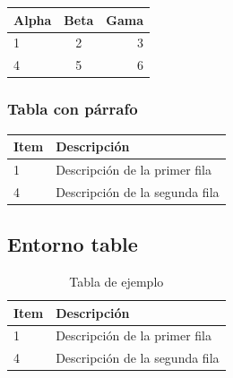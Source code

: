 \documentclass{article}
\begin{document}
\begin{tabular}{| l | c | r |}
\hline
Alpha & Beta & Gama \\
\hline \hline
1 & 2 & 3 \\
\hline
4 & 5 & 6 \\
\hline
\end{tabular}

\subsubsection{Tabla con párrafo}

\begin{tabular}{| l | p{2.5cm} |}
\hline
Item & Descripción \\
\hline \hline
1 & Descripción de la primer fila \\
\hline
4 & Descripción de la segunda fila \\
\hline
\end{tabular}

\subsection{Entorno table}

\begin{table}[h]
  \centering
  \begin{tabular}{| l | p{2.5cm} |}
  \hline
  Item & Descripción \\
  \hline \hline
  1 & Descripción de la primer fila \\
  \hline
  4 & Descripción de la segunda fila \\
  \hline
  \end{tabular}
  \caption{Tabla de ejemplo}
  \label{tab:tabla}
\end{table}
\end{document}
